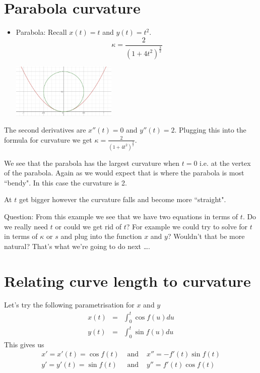 \documentclass[]{article} %
\theoremstyle{definition}
\theoremstyle{theorem}
\begin{document}
\section{Parabola curvature}
\begin{tcolorbox}
	\begin{itemize}	
		\item Parabola: Recall $x(t)=t$ and $y(t)=t^2$. 
		\[
		\kappa = \frac{2}{\left(1 + 4t^2 \right) ^ \frac{3}{2}}
		\]
		\begin{minipage}{\linewidth}
			\centering
			\includegraphics[width=50mm, scale=0.4]{Parabola.png}
		\end{minipage}
	\end{itemize}
\end{tcolorbox}
The second derivatives are $x''(t)=0$ and $y''(t)=2$. Plugging this into the formula for curvature we get $\kappa = \frac{2}{\left(1 + 4t^2 \right) ^ \frac{3}{2}}$.

We see that the parabola has the largest curvature when $t=0$ i.e. at the vertex of the parabola. Again as we would expect that is where the parabola is most ``bendy". In this case the curvature is 2.

At $t$ get bigger however the curvature falls and become more ``straight".

Question: From this example we see that we have two equations in terms of $t$. Do we really need $t$ or could we get rid of $t$? For example we could try to solve for $t$ in terms of $\kappa$ or $s$ and plug into the function $x$ and $y$? Wouldn't that be more  natural? That's what we're going to do next \dots.

\section{Relating curve length to curvature}
\begin{tcolorbox}
	Let's try the following parametrisation for $x$ and $y$
	\begin{eqnarray*}
		x(t) &=& \int_{0}^{t} \cos f(u) du \\
		y(t) &=& \int_{0}^{t} \sin f(u) du
	\end{eqnarray*}
	This gives us
	\begin{eqnarray*}
		x' = x'(t) = \cos f(t) &\mbox{ and }& x''=-f'(t) \sin f(t) \\
		y' = y'(t) = \sin f(t) &\mbox{ and }& y''=f'(t) \cos f(t)
	\end{eqnarray*}
\end{tcolorbox}
\end{document}
